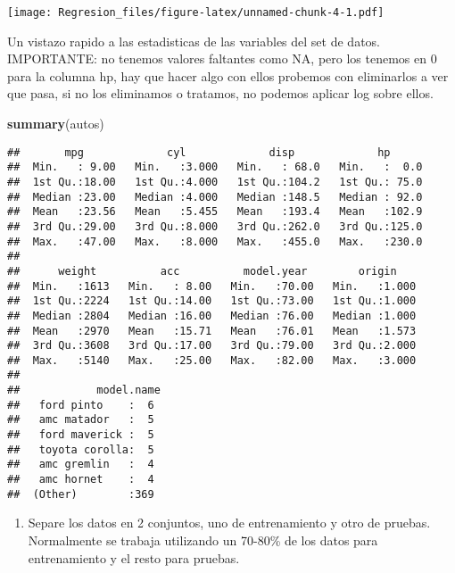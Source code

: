 \documentclass[]{article}
\newenvironment{Shaded}{\begin{snugshade}}{\end{snugshade}}
\newcommand{\KeywordTok}[1]{\textcolor[rgb]{0.13,0.29,0.53}{\textbf{#1}}}
\newcommand{\NormalTok}[1]{#1}
\providecommand{\tightlist}{%
  \setlength{\itemsep}{0pt}\setlength{\parskip}{0pt}}
\begin{document}
\texttt{[image: Regresion\_files/figure-latex/unnamed-chunk-4-1.pdf]}

Un vistazo rapido a las estadisticas de las variables del set de datos.
IMPORTANTE: no tenemos valores faltantes como NA, pero los tenemos en 0
para la columna hp, hay que hacer algo con ellos probemos con
eliminarlos a ver que pasa, si no los eliminamos o tratamos, no podemos
aplicar log sobre ellos.

\begin{Shaded}
\begin{Highlighting}[]
\KeywordTok{summary}\NormalTok{(autos)}
\end{Highlighting}
\end{Shaded}

\begin{verbatim}
##       mpg             cyl             disp             hp       
##  Min.   : 9.00   Min.   :3.000   Min.   : 68.0   Min.   :  0.0  
##  1st Qu.:18.00   1st Qu.:4.000   1st Qu.:104.2   1st Qu.: 75.0  
##  Median :23.00   Median :4.000   Median :148.5   Median : 92.0  
##  Mean   :23.56   Mean   :5.455   Mean   :193.4   Mean   :102.9  
##  3rd Qu.:29.00   3rd Qu.:8.000   3rd Qu.:262.0   3rd Qu.:125.0  
##  Max.   :47.00   Max.   :8.000   Max.   :455.0   Max.   :230.0  
##                                                                 
##      weight          acc          model.year        origin     
##  Min.   :1613   Min.   : 8.00   Min.   :70.00   Min.   :1.000  
##  1st Qu.:2224   1st Qu.:14.00   1st Qu.:73.00   1st Qu.:1.000  
##  Median :2804   Median :16.00   Median :76.00   Median :1.000  
##  Mean   :2970   Mean   :15.71   Mean   :76.01   Mean   :1.573  
##  3rd Qu.:3608   3rd Qu.:17.00   3rd Qu.:79.00   3rd Qu.:2.000  
##  Max.   :5140   Max.   :25.00   Max.   :82.00   Max.   :3.000  
##                                                                
##            model.name 
##   ford pinto    :  6  
##   amc matador   :  5  
##   ford maverick :  5  
##   toyota corolla:  5  
##   amc gremlin   :  4  
##   amc hornet    :  4  
##  (Other)        :369
\end{verbatim}

\begin{enumerate}
\def\labelenumi{\arabic{enumi}.}
\setcounter{enumi}{2}
\tightlist
\item
  Separe los datos en 2 conjuntos, uno de entrenamiento y otro de
  pruebas. Normalmente se trabaja utilizando un 70-80\% de los datos
  para entrenamiento y el resto para pruebas.
\end{enumerate}
\end{document}
